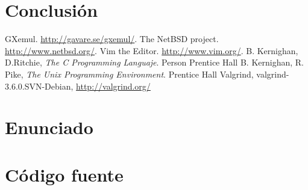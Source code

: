 \documentclass[a4paper, 10pt, twoside, notitlepage]{article}
\begin{document}
\newpage
\section{Conclusión}

\lipsum[3-3]


\vspace{.5cm}
\begin{thebibliography}{5}
 \bibitem{} GXemul. \url{http://gavare.se/gxemul/}.
 \bibitem{} The NetBSD project. \url{http://www.netbsd.org/}.
 \bibitem{} Vim the Editor. \url{http://www.vim.org/}.
 \bibitem{} B. Kernighan, D.Ritchie, \textit{The C Programming Languaje}. Person Prentice Hall 
 \bibitem{} B. Kernighan, R. Pike, \textit{The Unix Programming Environment}. Prentice Hall
  Valgrind, valgrind-3.6.0.SVN-Debian, \url{http://valgrind.org/}
\end{thebibliography}
 
\newpage

 \appendix
 \section{Enunciado}
 
\newpage

 \section{Código fuente}

%  
\end{document}
